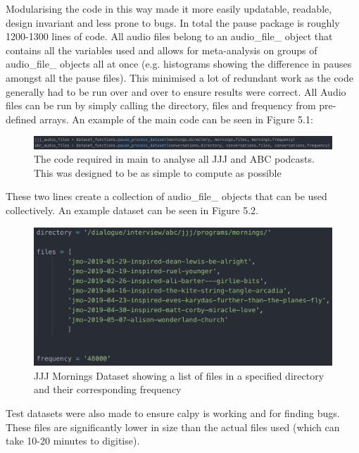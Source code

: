 Modularising the code in this way made it more easily updatable, readable, design invariant and less prone to bugs. In total the pause package is roughly 1200-1300 lines of code. All audio files belong to an audio\_file\_ object that contains all the variables used and allows for meta-analysis on groups of audio\_file\_ objects all at once (e.g. histograms showing the difference in pauses amongst all the pause files). This minimised a lot of redundant work as the code generally had to be run over and over to ensure results were correct. All Audio files can be run by simply calling the directory, files and frequency from pre-defined arrays. An example of the main code can be seen in Figure 5.1: 
\begin{figure}[h]
	\begin{center}
		\includegraphics[scale=0.5]{src/main-matter/methodology/code-base/code/main}
		\caption{The code required in main to analyse all JJJ and ABC podcasts. This was designed to be as simple to compute as possible}
		\label{default}
	\end{center}
\end{figure}

These two lines create a collection of audio\_file\_ objects that can be used collectively. An example dataset can be seen in Figure 5.2.\\
\begin{figure}[h]
	\begin{center}
		\includegraphics[scale=0.7]{src/main-matter/methodology/code-base/code/dataset}
		\caption{JJJ Mornings Dataset showing a list of files in a specified directory and their corresponding frequency}
		\label{default}
	\end{center}
\end{figure}
Test datasets were also made to ensure calpy is working and for finding bugs. These files are significantly lower in size than the actual files used (which can take 10-20 minutes to digitise). \\

